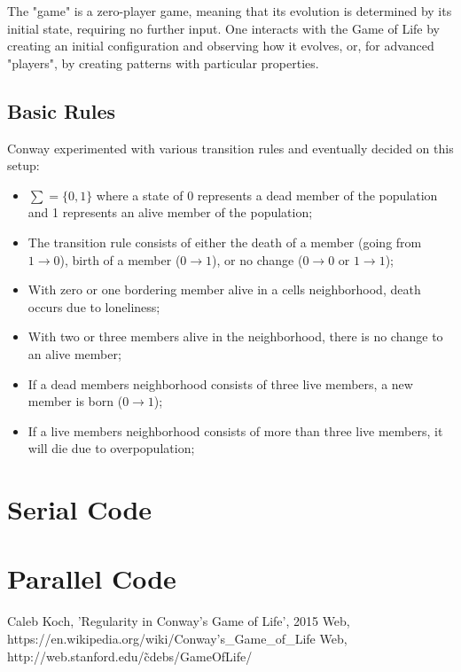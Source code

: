 \documentclass{report}%
\begin{document}
\noindent The "game" is a zero-player game, meaning that its evolution is determined by its initial state, requiring no further input. One interacts with the Game of Life by creating an initial configuration and observing how it evolves, or, for advanced "players", by creating patterns with particular properties. 

\section{Basic Rules}
Conway experimented with various transition rules and eventually decided on this setup:
\begin{itemize}

	\item $\sum = \{0, 1\}$ where a state of 0 represents a dead member of the population    and 1 represents an alive member of the population;
	
	\item The transition rule consists of either the death of a member (going from $1 \rightarrow 0$), birth of a member ($0 \rightarrow 1$), or no change ($0 \rightarrow 0$ or $1 \rightarrow 1$);
	
	\item With zero or one bordering member alive in a cells neighborhood, death occurs due to loneliness;
	\item With two or three members alive in the neighborhood, there is no change to an alive member;
	\item If a dead members neighborhood consists of three live members, a new member is born ($0 \rightarrow 1$);
	\item If a live members neighborhood consists of more than three live members, it will die due to overpopulation;
\end{itemize}
 


 
 








\appendix

\chapter{Serial Code}



\chapter{Parallel Code}



\begin{thebibliography}{9}
 Caleb Koch,  'Regularity in Conway's Game of Life', 2015
 Web, https:\slash\slash en.wikipedia.org\slash wiki\slash Conway's\_Game\_of\_Life
 Web,  http:\slash\slash web.stanford.edu\slash\~cdebs\slash GameOfLife\slash
\end{thebibliography}
\end{document}
